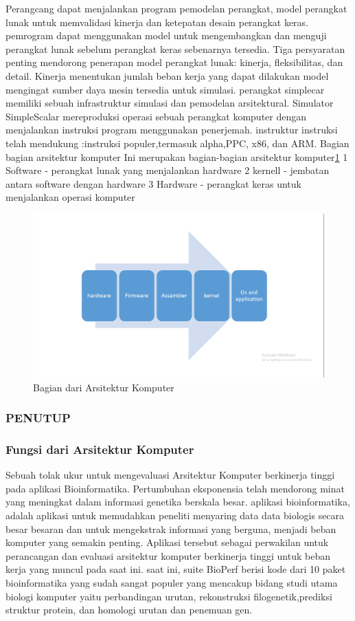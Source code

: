	Perangcang dapat menjalankan program pemodelan perangkat, model perangkat lunak untuk memvalidasi kinerja dan ketepatan desain perangkat keras.
	pemrogram dapat menggunakan model  untuk mengembangkan dan menguji perangkat lunak sebelum perangkat keras sebenarnya tersedia.
	Tiga persyaratan penting mendorong penerapan model perangkat lunak: kinerja, fleksibilitas, dan detail. 
	Kinerja menentukan jumlah beban kerja yang dapat dilakukan model mengingat sumber daya mesin tersedia untuk simulasi.
	perangkat simplecar memiliki sebuah infrastruktur simulasi dan pemodelan arsitektural.
	Simulator SimpleScalar mereproduksi operasi sebuah  perangkat komputer dengan menjalankan instruksi program menggunakan penerjemah.
	instruktur instruksi telah mendukung :instruksi populer,termasuk alpha,PPC, x86, dan ARM.\cite{austin2002simplescalar}
	Bagian bagian arsitektur komputer
	Ini merupakan bagian-bagian arsitektur komputer\ref{sasasa}
		1 Software - perangkat lunak yang menjalankan hardware
		2 kernell - jembatan antara software dengan hardware
		3 Hardware - perangkat keras untuk menjalankan operasi komputer
    \begin{figure}[ht]
		\centerline{\includegraphics[width=1\textwidth]{figures/sasasa.PNG}}
		\caption{Bagian dari Arsitektur Komputer}
		\label{sasasa}
	\end{figure}
	
	\subsubsection{PENUTUP}
	\subsubsection{Fungsi dari Arsitektur Komputer}
	Sebuah tolak ukur untuk mengevaluasi Arsitektur Komputer berkinerja tinggi pada aplikasi Bioinformatika.
	Pertumbuhan eksponensia telah mendorong minat yang meningkat dalam informasi genetika berskala besar. 
	aplikasi bioinformatika, adalah aplikasi untuk memudahkan peneliti menyaring data data biologis secara besar besaran dan untuk mengekstrak informasi yang berguna, menjadi beban komputer yang semakin penting.
	Aplikasi tersebut sebagai perwakilan untuk perancangan dan evaluasi arsitektur komputer berkinerja tinggi untuk beban kerja yang muncul pada saat ini.
	saat ini, suite BioPerf berisi kode dari 10 paket bioinformatika yang sudah sangat populer yang mencakup bidang studi utama biologi komputer yaitu perbandingan urutan, rekonstruksi filogenetik,prediksi struktur protein, dan homologi urutan dan penemuan gen.\cite{bader2005bioperf}
